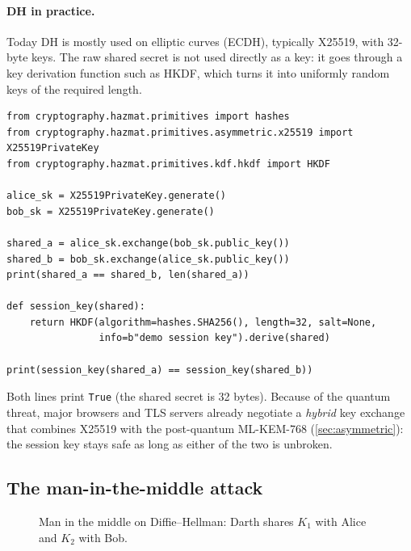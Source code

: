 \paragraph{DH in practice.} Today DH is mostly used on elliptic curves (ECDH), typically X25519, with 32-byte keys. The raw shared secret is not used directly as a key: it goes through a key derivation function such as HKDF, which turns it into uniformly random keys of the required length.

\begin{verbatim}
from cryptography.hazmat.primitives import hashes
from cryptography.hazmat.primitives.asymmetric.x25519 import X25519PrivateKey
from cryptography.hazmat.primitives.kdf.hkdf import HKDF

alice_sk = X25519PrivateKey.generate()
bob_sk = X25519PrivateKey.generate()

shared_a = alice_sk.exchange(bob_sk.public_key())
shared_b = bob_sk.exchange(alice_sk.public_key())
print(shared_a == shared_b, len(shared_a))

def session_key(shared):
    return HKDF(algorithm=hashes.SHA256(), length=32, salt=None,
                info=b"demo session key").derive(shared)

print(session_key(shared_a) == session_key(shared_b))
\end{verbatim}

Both lines print \texttt{True} (the shared secret is 32 bytes). Because of the quantum threat, major browsers and TLS servers already negotiate a \emph{hybrid} key exchange that combines X25519 with the post-quantum ML-KEM-768 (\cref{sec:asymmetric}): the session key stays safe as long as either of the two is unbroken.

\subsection{The man-in-the-middle attack}

\begin{figure}[H]
\centering
{}
\caption{Man in the middle on Diffie--Hellman: Darth shares $K_1$ with Alice and $K_2$ with Bob.}
\label{fig:dh-mitm}
\end{figure}

